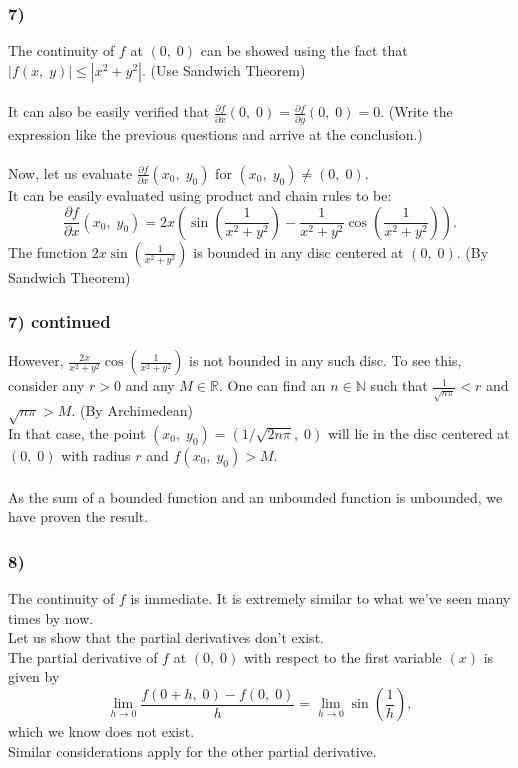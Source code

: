 \documentclass[handout]{beamer}
\begin{document}
\begin{frame}
    \frametitle{7)}
    The continuity of $f$ at $(0,\;0)$ can be showed using the fact that $|f(x,\;y)| \le |x^2 + y^2|.$ (Use Sandwich Theorem)\\~\\
        It can also be easily verified that $\frac{\partial f}{\partial x}(0,\;0) = \frac{\partial f}{\partial y}(0,\;0) = 0.$ (Write the expression like the previous questions and arrive at the conclusion.)\\~\\
        Now, let us evaluate $\frac{\partial f}{\partial x}(x_0,\;y_0)$ for $(x_0,\;y_0) \neq (0,\;0).$\\
        It can be easily evaluated using product and chain rules to be:
        \[\frac{\partial f}{\partial x}(x_0,\;y_0) = 2x\left(\sin\left(\frac{1}{x^2 + y^2}\right) - \frac{1}{x^2 + y^2}\cos\left(\frac{1}{x^2 + y^2}\right)\right).\]
        The function $\displaystyle2x\sin\left(\frac{1}{x^2 + y^2}\right)$ is bounded in any disc centered at $(0,\;0).$ \hfill (By Sandwich Theorem)\\
    \end{frame}
    
    \begin{frame}
        \frametitle{7) continued}
        However, $\displaystyle\frac{2x}{x^2 + y^2}\cos\left(\frac{1}{x^2 + y^2}\right)$ is not bounded in any such disc. To see this, consider any $r > 0$ and any $M \in \mathbb{R}.$ One can find an $n \in \mathbb{N}$ such that $\frac{1}{\sqrt{n\pi}} < r$ and $\sqrt{n\pi} > M.$ \hfill (By Archimedean)\\
        In that case, the point $(x_0,\;y_0) = (1/\sqrt{2n\pi},\;0)$ will lie in the disc centered at $(0,\;0)$ with radius $r$ and $f(x_0,\;y_0) > M.$\\~\\
        As the sum of a bounded function and an unbounded function is unbounded, we have proven the result.
    \end{frame}


\begin{frame}
	\frametitle{8)}
    The continuity of $f$ is immediate. It is extremely similar to what we've seen many times by now.\\
	Let us show that the partial derivatives don't exist.\\
	The partial derivative of $f$ at $(0,\;0)$ with respect to the first variable $(x)$ is given by
	\[\lim_{h\to 0}\frac{f(0 + h,\; 0) - f(0,\;0)}{h} = \lim_{h\to 0}\sin\left(\frac{1}{h}\right),\]
	which we know does not exist.\\
	Similar considerations apply for the other partial derivative.

\end{frame}
\end{document}
